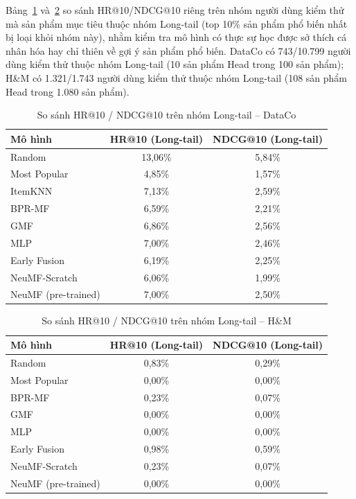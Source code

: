Bảng~\ref{tab:longtail} và~\ref{tab:longtail_hm} so sánh HR@10/NDCG@10 riêng trên nhóm người dùng kiểm thử mà sản phẩm mục tiêu thuộc nhóm Long-tail (top 10\% sản phẩm phổ biến nhất bị loại khỏi nhóm này), nhằm kiểm tra mô hình có thực sự học được sở thích cá nhân hóa hay chỉ thiên về gợi ý sản phẩm phổ biến. DataCo có 743/10.799 người dùng kiểm thử thuộc nhóm Long-tail (10 sản phẩm Head trong 100 sản phẩm); H\&M có 1.321/1.743 người dùng kiểm thử thuộc nhóm Long-tail (108 sản phẩm Head trong 1.080 sản phẩm).

\begin{table}[htbp]
    \centering
    \caption{So sánh HR@10 / NDCG@10 trên nhóm Long-tail -- DataCo}
    \label{tab:longtail}
    \begin{tabular}{|l|c|c|}
        \hline
        \textbf{Mô hình} & \textbf{HR@10 (Long-tail)} & \textbf{NDCG@10 (Long-tail)} \\
        \hline
        Random & 13,06\% & 5,84\% \\
        \hline
        Most Popular & 4,85\% & 1,57\% \\
        \hline
        ItemKNN & 7,13\% & 2,59\% \\
        \hline
        BPR-MF & 6,59\% & 2,21\% \\
        \hline
        GMF & 6,86\% & 2,56\% \\
        \hline
        MLP & 7,00\% & 2,46\% \\
        \hline
        Early Fusion & 6,19\% & 2,25\% \\
        \hline
        NeuMF-Scratch & 6,06\% & 1,99\% \\
        \hline
        NeuMF (pre-trained) & 7,00\% & 2,50\% \\
        \hline
    \end{tabular}
\end{table}

\begin{table}[htbp]
    \centering
    \caption{So sánh HR@10 / NDCG@10 trên nhóm Long-tail -- H\&M}
    \label{tab:longtail_hm}
    \begin{tabular}{|l|c|c|}
        \hline
        \textbf{Mô hình} & \textbf{HR@10 (Long-tail)} & \textbf{NDCG@10 (Long-tail)} \\
        \hline
        Random & 0,83\% & 0,29\% \\
        \hline
        Most Popular & 0,00\% & 0,00\% \\
        \hline
        BPR-MF & 0,23\% & 0,07\% \\
        \hline
        GMF & 0,00\% & 0,00\% \\
        \hline
        MLP & 0,00\% & 0,00\% \\
        \hline
        Early Fusion & 0,98\% & 0,59\% \\
        \hline
        NeuMF-Scratch & 0,23\% & 0,07\% \\
        \hline
        NeuMF (pre-trained) & 0,00\% & 0,00\% \\
        \hline
    \end{tabular}
\end{table}

